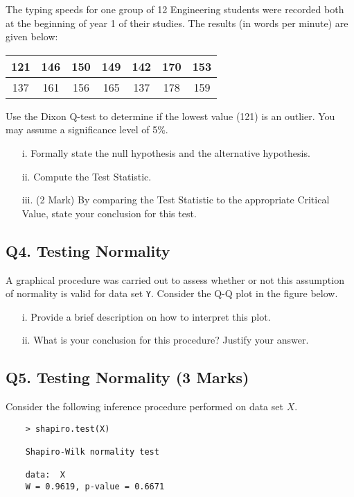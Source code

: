 \documentclass[a4paper,12pt]{article}
\begin{document}
The typing speeds for one group of 12 Engineering students were recorded both at the beginning of year 1 of their studies. The results (in words per minute) are given below:

\begin{center}
\begin{tabular}{|c|c|c|c|c|c|c|}
\hline
121 & 146 & 150 &149 &142 &170& 153\\ \hline
 137 & 161 & 156& 165& 137& 178& 159
\\ \hline
\end{tabular}
\end{center}
Use the Dixon Q-test to determine if the lowest value (121) is an outlier. You may assume a significance level of 5\%.

\begin{itemize}
\item[i.]  Formally state the null hypothesis and the alternative hypothesis.
\item[ii.]  Compute the Test Statistic.
\item[iii.] (2 Mark) By comparing the Test Statistic to the appropriate Critical Value, state your conclusion for this test.
\end{itemize}

\subsection*{Q4. Testing Normality } %
A graphical procedure was carried out to assess whether or not this assumption of normality is valid for data set \texttt{Y}. Consider the Q-Q plot in the figure below.


\begin{itemize}
	\item[i.]  Provide a brief description on how to interpret this plot.
	\item[ii.]  What is your conclusion for this procedure? Justify your answer.
\end{itemize}

\subsection*{Q5. Testing Normality (3 Marks)} %
Consider the following inference procedure performed on data set $X$.
\begin{center}
	\begin{verbatim}
	> shapiro.test(X)
	
	Shapiro-Wilk normality test
	
	data:  X
	W = 0.9619, p-value = 0.6671
	
	\end{verbatim}
\end{center}
\end{document}
